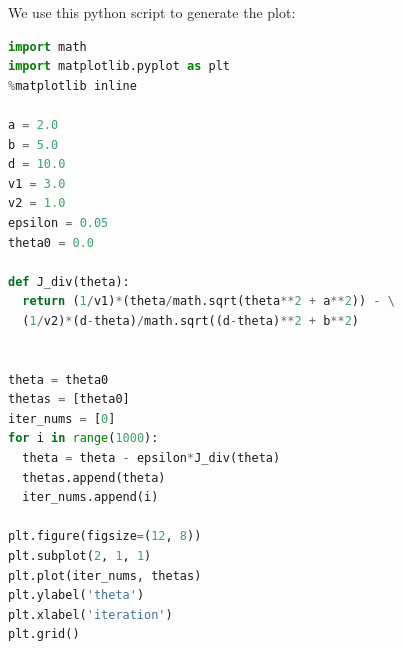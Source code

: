 \documentclass{article}
\begin{document}
We use this python script to generate the plot:

\begin{lstlisting}[language=python, caption={Resolve contention}, label={main_1}, basicstyle=\small]
import math
import matplotlib.pyplot as plt
%matplotlib inline

a = 2.0
b = 5.0
d = 10.0
v1 = 3.0
v2 = 1.0
epsilon = 0.05
theta0 = 0.0

def J_div(theta):
  return (1/v1)*(theta/math.sqrt(theta**2 + a**2)) - \
  (1/v2)*(d-theta)/math.sqrt((d-theta)**2 + b**2)


theta = theta0
thetas = [theta0]
iter_nums = [0]
for i in range(1000):
  theta = theta - epsilon*J_div(theta)
  thetas.append(theta)
  iter_nums.append(i)

plt.figure(figsize=(12, 8))
plt.subplot(2, 1, 1)
plt.plot(iter_nums, thetas)
plt.ylabel('theta')
plt.xlabel('iteration')
plt.grid()
\end{lstlisting}
\end{document}
